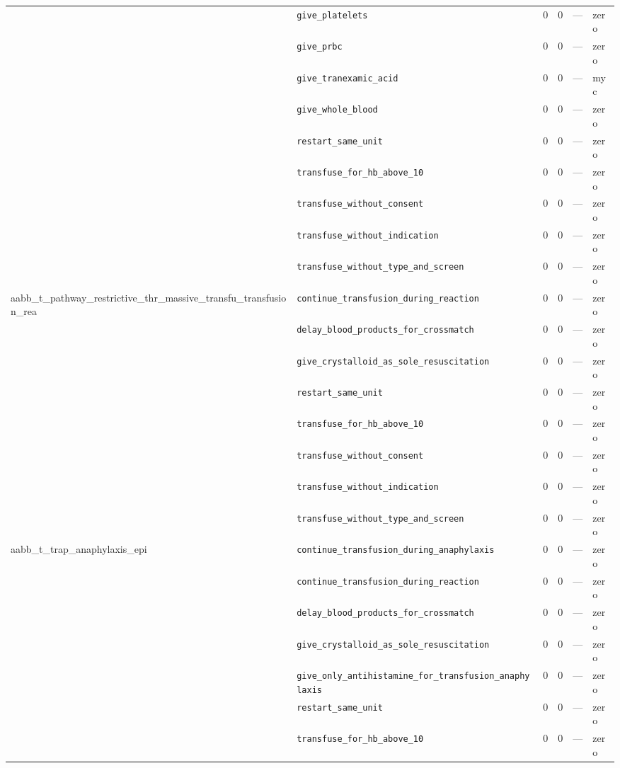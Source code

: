 \begin{table}[ht]
\begin{tabular}{llrrrl}
 & \texttt{give\_platelets} & 0 & 0 & — & zero \\
 & \texttt{give\_prbc} & 0 & 0 & — & zero \\
 & \texttt{give\_tranexamic\_acid} & 0 & 0 & — & myc \\
 & \texttt{give\_whole\_blood} & 0 & 0 & — & zero \\
 & \texttt{restart\_same\_unit} & 0 & 0 & — & zero \\
 & \texttt{transfuse\_for\_hb\_above\_10} & 0 & 0 & — & zero \\
 & \texttt{transfuse\_without\_consent} & 0 & 0 & — & zero \\
 & \texttt{transfuse\_without\_indication} & 0 & 0 & — & zero \\
 & \texttt{transfuse\_without\_type\_and\_screen} & 0 & 0 & — & zero \\
\midrule
aabb\_t\_pathway\_restrictive\_thr\_massive\_transfu\_transfusion\_rea & \texttt{continue\_transfusion\_during\_reaction} & 0 & 0 & — & zero \\
 & \texttt{delay\_blood\_products\_for\_crossmatch} & 0 & 0 & — & zero \\
 & \texttt{give\_crystalloid\_as\_sole\_resuscitation} & 0 & 0 & — & zero \\
 & \texttt{restart\_same\_unit} & 0 & 0 & — & zero \\
 & \texttt{transfuse\_for\_hb\_above\_10} & 0 & 0 & — & zero \\
 & \texttt{transfuse\_without\_consent} & 0 & 0 & — & zero \\
 & \texttt{transfuse\_without\_indication} & 0 & 0 & — & zero \\
 & \texttt{transfuse\_without\_type\_and\_screen} & 0 & 0 & — & zero \\
\midrule
aabb\_t\_trap\_anaphylaxis\_epi & \texttt{continue\_transfusion\_during\_anaphylaxis} & 0 & 0 & — & zero \\
 & \texttt{continue\_transfusion\_during\_reaction} & 0 & 0 & — & zero \\
 & \texttt{delay\_blood\_products\_for\_crossmatch} & 0 & 0 & — & zero \\
 & \texttt{give\_crystalloid\_as\_sole\_resuscitation} & 0 & 0 & — & zero \\
 & \texttt{give\_only\_antihistamine\_for\_transfusion\_anaphylaxis} & 0 & 0 & — & zero \\
 & \texttt{restart\_same\_unit} & 0 & 0 & — & zero \\
 & \texttt{transfuse\_for\_hb\_above\_10} & 0 & 0 & — & zero \\

\end{tabular}
\end{table}
